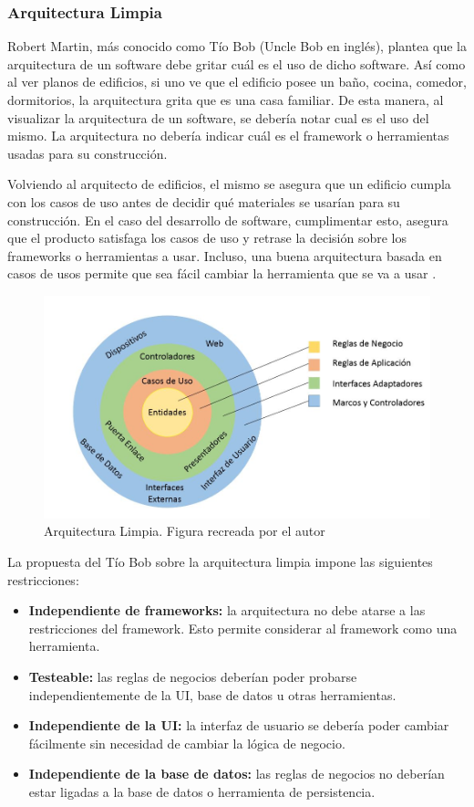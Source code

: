 \subsubsection{\textbf{Arquitectura Limpia}}
Robert Martin, más conocido como Tío Bob (Uncle Bob en inglés), plantea que la arquitectura de un software debe gritar cuál es el uso de dicho software. Así como al ver planos de edificios, si uno ve que el edificio posee un baño, cocina, comedor, dormitorios, la arquitectura grita que es una casa familiar. De esta manera, al visualizar la arquitectura de un software, se debería notar cual es el uso del mismo. La arquitectura no debería indicar cuál es el framework o herramientas usadas para su construcción.

Volviendo al arquitecto de edificios, el mismo se asegura que un edificio cumpla con los casos de uso antes de decidir qué materiales se usarían para su construcción. En el caso del desarrollo de software, cumplimentar esto, asegura que el producto satisfaga los casos de uso y retrase la decisión sobre los frameworks o herramientas a usar. Incluso, una buena arquitectura basada en casos de usos permite que sea fácil cambiar la herramienta que se va a usar .

\begin{figure}[h]
\centering%
\includegraphics[width=0.8\linewidth]{contextualizacion/MarcoReferencial/imgs/Arquitectura_limpia.JPG}%
\caption{Arquitectura Limpia. Figura recreada por el autor \cite{clean-architecture_2018}} \label{fig:clean_architecture}
\end{figure}


La propuesta del Tío Bob sobre la arquitectura limpia impone las siguientes restricciones:\\

\begin{itemize}
\item \textbf{Independiente de frameworks:} la arquitectura no debe atarse a las restricciones del framework. Esto permite considerar al framework como una herramienta.
\item \textbf{Testeable:} las reglas de negocios deberían poder probarse independientemente de la UI, base de datos u otras herramientas.
\item \textbf{Independiente de la UI:} la interfaz de usuario se debería poder cambiar fácilmente sin necesidad de cambiar la lógica de negocio.
\item \textbf{Independiente de la base de datos:} las reglas de negocios no deberían estar ligadas a la base de datos o herramienta de persistencia.
\end{itemize}


